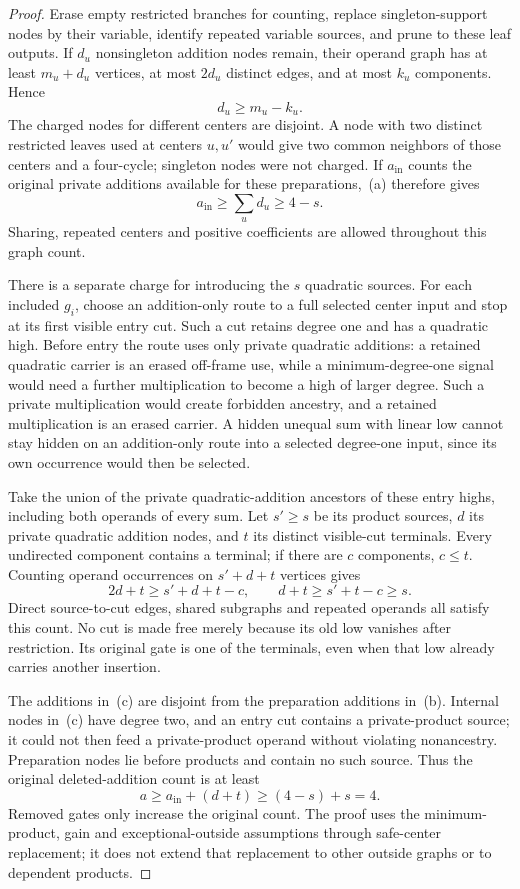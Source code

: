 \documentclass[11pt]{article}
\theoremstyle{definition}
\theoremstyle{remark}
\begin{document}
\begin{proof}
Erase empty restricted branches for counting, replace singleton-support nodes by their variable, identify repeated variable sources, and prune to these leaf outputs. If $d_u$ nonsingleton addition nodes remain, their operand graph has at least $m_u+d_u$ vertices, at most $2d_u$ distinct edges, and at most $k_u$ components. Hence
\[
 d_u\ge m_u-k_u.
\]
The charged nodes for different centers are disjoint. A node with two distinct restricted leaves used at centers $u,u'$ would give two common neighbors of those centers and a four-cycle; singleton nodes were not charged. If $a_{\mathrm{in}}$ counts the original private additions available for these preparations,~(a) therefore gives
\[
 a_{\mathrm{in}}\ge\sum_u d_u\ge4-s.                \tag{b}
\]
Sharing, repeated centers and positive coefficients are allowed throughout this graph count.

There is a separate charge for introducing the $s$ quadratic sources. For each included $g_i$, choose an addition-only route to a full selected center input and stop at its first visible entry cut. Such a cut retains degree one and has a quadratic high. Before entry the route uses only private quadratic additions: a retained quadratic carrier is an erased off-frame use, while a minimum-degree-one signal would need a further multiplication to become a high of larger degree. Such a private multiplication would create forbidden ancestry, and a retained multiplication is an erased carrier. A hidden unequal sum with linear low cannot stay hidden on an addition-only route into a selected degree-one input, since its own occurrence would then be selected.

Take the union of the private quadratic-addition ancestors of these entry highs, including both operands of every sum. Let $s'\ge s$ be its product sources, $d$ its private quadratic addition nodes, and $t$ its distinct visible-cut terminals. Every undirected component contains a terminal; if there are $c$ components, $c\le t$. Counting operand occurrences on $s'+d+t$ vertices gives
\[
 2d+t\ge s'+d+t-c,\qquad d+t\ge s'+t-c\ge s.        \tag{c}
\]
Direct source-to-cut edges, shared subgraphs and repeated operands all satisfy this count. No cut is made free merely because its old low vanishes after restriction. Its original gate is one of the terminals, even when that low already carries another insertion.

The additions in~(c) are disjoint from the preparation additions in~(b). Internal nodes in~(c) have degree two, and an entry cut contains a private-product source; it could not then feed a private-product operand without violating nonancestry. Preparation nodes lie before products and contain no such source. Thus the original deleted-addition count is at least
\[
 a\ge a_{\mathrm{in}}+(d+t)\ge(4-s)+s=4.
\]
Removed gates only increase the original count. The proof uses the minimum-product, gain and exceptional-outside assumptions through safe-center replacement; it does not extend that replacement to other outside graphs or to dependent products.
\end{proof}
\end{document}
